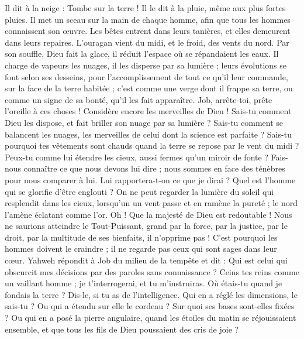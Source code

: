 \begin{multicols}{2}
Il dit à la neige : Tombe sur la terre ! Il le dit à la pluie, même aux plus fortes pluies.
Il met un sceau sur la main de chaque homme, afin que tous les hommes connaissent son œuvre.
Les bêtes entrent dans leurs tanières, et elles demeurent dans leurs repaires.
L'ouragan vient du midi, et le froid, des vents du nord.
Par son souffle, Dieu fait la glace, il réduit l'espace où se répandaient les eaux.
Il charge de vapeurs les nuages, il les disperse par sa lumière ;
leurs évolutions se font selon ses desseins, pour l'accomplissement de tout ce qu'il leur commande, sur la face de la terre habitée ;
c'est comme une verge dont il frappe sa terre, ou comme un signe de sa bonté, qu'il les fait apparaître.
Job, arrête-toi, prête l'oreille à ces choses ! Considère encore les merveilles de Dieu !
Sais-tu comment Dieu les dispose, et fait briller son nuage par sa lumière ?
Sais-tu comment se balancent les nuages, les merveilles de celui dont la science est parfaite ?
Sais-tu pourquoi tes vêtements sont chauds quand la terre se repose par le vent du midi ?
Peux-tu comme lui étendre les cieux, aussi fermes qu'un miroir de fonte ?
Fais-nous connaître ce que nous devons lui dire ; nous sommes en face des ténèbres pour nous comparer à lui.
Lui rapportera-t-on ce que je dirai ? Quel est l'homme qui se glorifie d'être englouti ?
On ne peut regarder la lumière du soleil qui resplendit dans les cieux, lorsqu'un un vent passe et en ramène la pureté ;
le nord l'amène éclatant comme l'or. Oh ! Que la majesté de Dieu est redoutable !
Nous ne saurions atteindre le Tout-Puissant, grand par la force, par la justice, par le droit, par la multitude de ses bienfaits, il n'opprime pas !
C'est pourquoi les hommes doivent le craindre ; il ne regarde pas ceux qui sont sages dans leur cœur.
\VerseOne{}Yahweh répondit à Job du milieu de la tempête et dit :
Qui est celui qui obscurcit mes décisions par des paroles sans connaissance ?
Ceins tes reins comme un vaillant homme ; je t'interrogerai, et tu m'instruiras.
Où étais-tu quand je fondais la terre ? Dis-le, si tu as de l'intelligence.
Qui en a réglé les dimensions, le sais-tu ? Ou qui a étendu sur elle le cordeau ?
Sur quoi ses bases sont-elles fixées ? Ou qui en a posé la pierre angulaire,
quand les étoiles du matin se réjouissaient ensemble, et que tous les fils de Dieu poussaient des cris de joie ?

\end{multicols}
